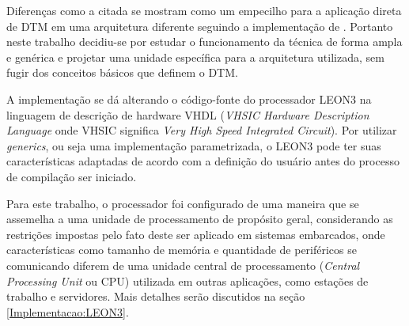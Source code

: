 Diferenças como a citada se mostram como um empecilho para a aplicação direta de DTM em uma arquitetura diferente seguindo a implementação de \cite{costa2001explorando}. Portanto neste trabalho decidiu-se por estudar o funcionamento da técnica de forma ampla e genérica e projetar uma unidade específica para a arquitetura utilizada, sem fugir dos conceitos básicos que definem o DTM.

A implementação se dá alterando o código-fonte do processador LEON3 na linguagem de descrição de hardware VHDL (\textit{VHSIC Hardware Description Language} onde VHSIC significa \textit{Very High Speed Integrated Circuit}). Por utilizar \textit{generics}, ou seja uma implementação parametrizada, o LEON3 pode ter suas características adaptadas de acordo com a definição do usuário antes do processo de compilação ser iniciado.

Para este trabalho, o processador foi configurado de uma maneira que se assemelha a uma unidade de processamento de propósito geral, considerando as restrições impostas pelo fato deste ser aplicado em sistemas embarcados, onde características como tamanho de memória e quantidade de periféricos se comunicando diferem de uma unidade central de processamento (\textit{Central Processing Unit} ou CPU) utilizada em outras aplicações, como estações de trabalho e servidores. Mais detalhes serão discutidos na seção \ref{Implementacao:LEON3}.

